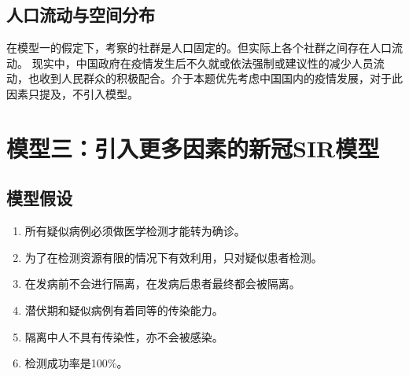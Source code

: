 \documentclass[withoutpreface,bwprint]{cumcmthesis} %
\begin{document}
\subsection{人口流动与空间分布}
在模型一的假定下，考察的社群是人口固定的。但实际上各个社群之间存在人口流动。
现实中，中国政府在疫情发生后不久就或依法强制或建议性的减少人员流动，也收到人民群众的积极配合。介于本题优先考虑中国国内的疫情发展，对于此因素只提及，不引入模型。


\section{模型三：引入更多因素的新冠SIR模型}
\subsection{模型假设}
    \begin{enumerate}
        \item 所有疑似病例必须做医学检测才能转为确诊。
        \item 为了在检测资源有限的情况下有效利用，只对疑似患者检测。
        \item 在发病前不会进行隔离，在发病后患者最终都会被隔离。
        \item 潜伏期和疑似病例有着同等的传染能力。
        \item 隔离中人不具有传染性，亦不会被感染。
        \item 检测成功率是100\%。
    \end{enumerate}\
\end{document}
